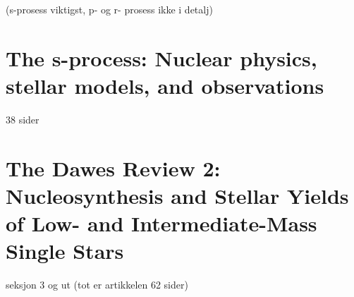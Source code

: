 \documentclass[a4paper,12pt]{article}
\begin{document}
(s-prosess viktigst, p- og r- prosess ikke i detalj)

\part{The s-process: Nuclear physics, stellar models, and observations}
38 sider



\part{The Dawes Review 2: Nucleosynthesis and Stellar Yields of Low- and Intermediate-Mass Single Stars}
seksjon 3 og ut (tot er artikkelen 62 sider)





\end{document}
